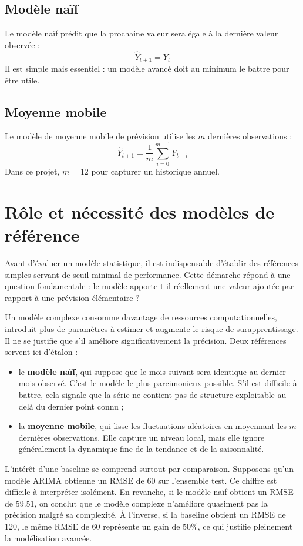 \documentclass[12pt,a4paper]{report}
\begin{document}
\subsection{Modèle naïf}
Le modèle naïf prédit que la prochaine valeur sera égale à la dernière valeur observée :
\[
\hat{Y}_{t+1} = Y_t
\]
Il est simple mais essentiel : un modèle avancé doit au minimum le battre pour être utile.

\subsection{Moyenne mobile}
Le modèle de moyenne mobile de prévision utilise les $m$ dernières observations :
\[
\hat{Y}_{t+1} = \frac{1}{m}\sum_{i=0}^{m-1}Y_{t-i}
\]
Dans ce projet, $m=12$ pour capturer un historique annuel.


\section{Rôle et nécessité des modèles de référence}
Avant d'évaluer un modèle statistique, il est indispensable d'établir des références simples servant de seuil minimal de performance. Cette démarche répond à une question fondamentale : le modèle apporte-t-il réellement une valeur ajoutée par rapport à une prévision élémentaire ?

Un modèle complexe consomme davantage de ressources computationnelles, introduit plus de paramètres à estimer et augmente le risque de surapprentissage. Il ne se justifie que s'il améliore significativement la précision. Deux références servent ici d'étalon :
\begin{itemize}
    \item le \textbf{modèle naïf}, qui suppose que le mois suivant sera identique au dernier mois observé. C'est le modèle le plus parcimonieux possible. S'il est difficile à battre, cela signale que la série ne contient pas de structure exploitable au-delà du dernier point connu ;
    \item la \textbf{moyenne mobile}, qui lisse les fluctuations aléatoires en moyennant les $m$ dernières observations. Elle capture un niveau local, mais elle ignore généralement la dynamique fine de la tendance et de la saisonnalité.
\end{itemize}

L'intérêt d'une baseline se comprend surtout par comparaison. Supposons qu'un modèle ARIMA obtienne un RMSE de 60 sur l'ensemble test. Ce chiffre est difficile à interpréter isolément. En revanche, si le modèle naïf obtient un RMSE de 59.51, on conclut que le modèle complexe n'améliore quasiment pas la précision malgré sa complexité. À l'inverse, si la baseline obtient un RMSE de 120, le même RMSE de 60 représente un gain de 50\%, ce qui justifie pleinement la modélisation avancée.
\end{document}
